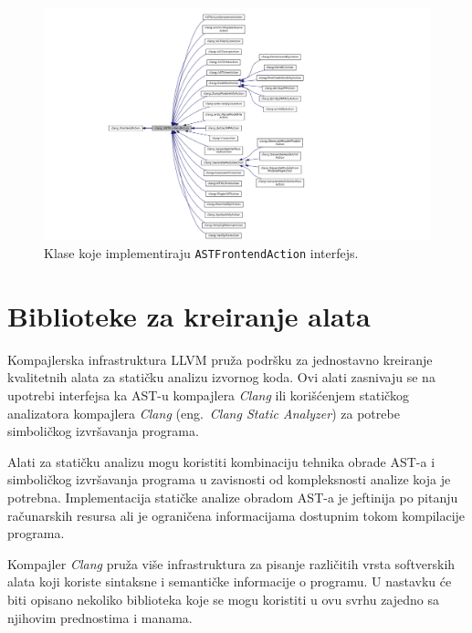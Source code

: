 \documentclass[12pt,oneside]{memoir}
\begin{document}
\begin{figure}[h!]
\begin{center}
\includegraphics[scale=0.4]{ASTFrontendAction.png}
\end{center}
\caption{Klase koje implementiraju \texttt{ASTFrontendAction} interfejs.}
\label{fig:ASTAction}
\end{figure}



\section{Biblioteke za kreiranje alata}

Kompajlerska infrastruktura LLVM pru\v{z}a podr\v{s}ku za jednostavno kreiranje kvalitetnih alata za stati\v{c}ku analizu izvornog koda. Ovi alati
zasnivaju se na upotrebi interfejsa ka AST-u kompajlera \textit{Clang} ili kori\v{s}\'{c}enjem stati\v{c}kog analizatora kompajlera \textit{Clang} (eng.~\textit{Clang Static Analyzer}) za potrebe simboli\v{c}kog izvr\v{s}avanja programa. \par Alati za stati\v{c}ku analizu mogu koristiti kombinaciju tehnika obrade AST-a i simboli\v{c}kog izvr\v{s}avanja programa u zavisnosti od kompleksnosti analize koja je potrebna. Implementacija stati\v{c}ke analize obradom AST-a je jeftinija po pitanju ra\v{c}unarskih resursa ali je ograni\v{c}ena informacijama dostupnim tokom kompilacije programa. \par 

 Kompajler \textit{Clang} pru\v{z}a vi\v{s}e infrastruktura za pisanje razli\v{c}itih vrsta softverskih alata koji koriste sintaksne i semanti\v{c}ke informacije o programu. U nastavku \'{c}e biti opisano nekoliko biblioteka koje se mogu koristiti u ovu svrhu zajedno sa njihovim prednostima i manama.
\end{document}
